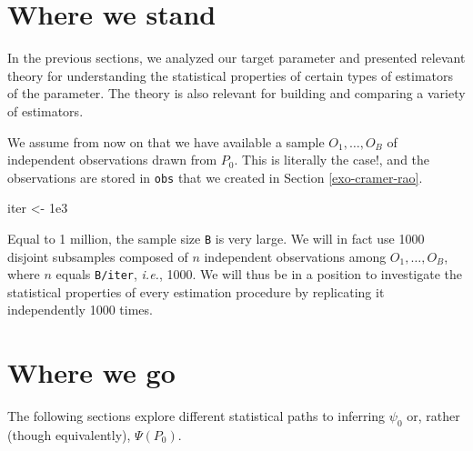\documentclass[11pt,openright,twoside]{book}
\newenvironment{Shaded}{\begin{snugshade}}{\end{snugshade}}
\newcommand{\FloatTok}[1]{\textcolor[rgb]{0.00,0.00,0.81}{#1}}
\newcommand{\NormalTok}[1]{#1}
\newcommand{\StringTok}[1]{\textcolor[rgb]{0.31,0.60,0.02}{#1}}
\theoremstyle{definition}
\theoremstyle{definition}
\theoremstyle{definition}
\theoremstyle{remark}
\begin{document}
\hypertarget{where-we-stand}{%
\section{Where we stand}\label{where-we-stand}}

In the previous sections, we analyzed our target parameter and presented
relevant theory for understanding the statistical properties of certain types
of estimators of the parameter. The theory is also relevant for building and
comparing a variety of estimators.

We assume from now on that we have available a sample \(O_{1}, \ldots, O_{B}\)
of independent observations drawn from \(P_{0}\). This is literally the case!,
and the observations are stored in \texttt{obs} that we created in Section
\ref{exo-cramer-rao}.

\begin{Shaded}
\begin{Highlighting}[]
\NormalTok{iter <-}\StringTok{ }\FloatTok{1e3}
\end{Highlighting}
\end{Shaded}

Equal to 1 million, the sample size \texttt{B} is very large. We will in fact
use 1000 disjoint subsamples composed of \(n\) independent
observations among \(O_{1}, \ldots, O_{B}\), where \(n\) equals \texttt{B/iter}, \emph{i.e.},
1000. We will thus be in a position to investigate the
statistical properties of every estimation procedure by replicating it
independently 1000 times.

\hypertarget{where-we-go}{%
\section{Where we go}\label{where-we-go}}

The following sections explore different statistical paths to inferring
\(\psi_{0}\) or, rather (though equivalently), \(\Psi(P_{0})\).
\end{document}
